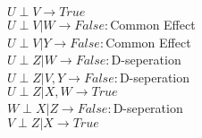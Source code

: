 \noindent
\begin{latin}
    \noindent
    $U \perp V \rightarrow True$\\
    $U \perp V | W \rightarrow False :$Common Effect\\
    $U \perp V | Y \rightarrow False :$Common Effect\\
    $U \perp Z | W  \rightarrow False :$D-seperation\\
    $U \perp Z | V,Y  \rightarrow False :$D-seperation\\
    $U \perp Z | X,W  \rightarrow True$\\
    $W \perp X | Z  \rightarrow False :$D-seperation\\
    $V \perp Z | X  \rightarrow True $\\
\end{latin}
 